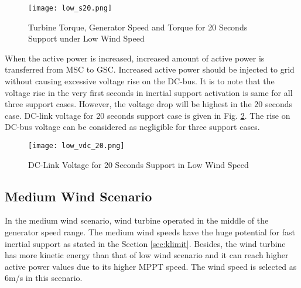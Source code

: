 \begin{figure}[h!]
	\centering
	\texttt{[image: low\_s20.png]}
	\caption{Turbine Torque, Generator Speed and Torque for 20 Seconds Support under Low Wind Speed}
	\label{low_torques3}
\end{figure}
When the active power is increased, increased amount of active power is transferred from MSC to GSC. Increased active power should be injected to grid without causing excessive voltage rise on the DC-bus. It is to note that the voltage rise in the very first seconds in inertial support activation is same for all three support cases. However, the voltage drop will be highest in the 20 seconds case. DC-link voltage for 20 seconds support case is given in Fig. \ref{low_vdc_s20}. The rise on DC-bus voltage can be considered as negligible for three support cases.
\begin{figure}[h!]
	\centering
	\texttt{[image: low\_vdc\_20.png]}
	\caption{DC-Link Voltage for 20 Seconds Support in Low Wind Speed}
	\label{low_vdc_s20}
\end{figure}
\subsection{Medium Wind Scenario}
In the medium wind scenario, wind turbine operated in the middle of the generator speed range. The medium wind speeds have the huge potential for fast inertial support as stated in the Section \ref{sec:klimit}. Besides, the wind turbine has more kinetic energy than that of low wind scenario and it can reach higher active power values due to its higher MPPT speed. The wind speed is selected as 6m/s in this scenario. 
